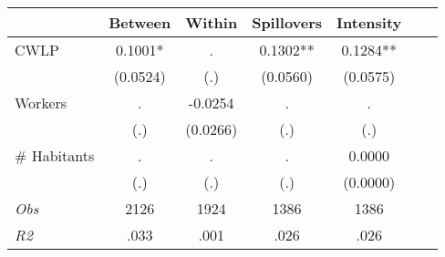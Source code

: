\begin{tabular}{l*{6}{c}}\hline&\multicolumn{1}{c}{Between}&\multicolumn{1}{c}{Within}&\multicolumn{1}{c}{Spillovers}&\multicolumn{1}{c}{Intensity}\\ \hline 
CWLP & 0.1001* & . & 0.1302** & 0.1284** \\
 & (0.0524) & (.) & (0.0560) & (0.0575) \\
Workers & . & -0.0254 & . & . \\
 & (.) & (0.0266) & (.) & (.) \\
\# Habitants & . & . & . & 0.0000 \\
  & (.) & (.) & (.) & (0.0000) \\
\hline \textit{Obs} & 2126 & 1924 & 1386 & 1386  \\ \textit{R2} & .033 & .001 & .026 & .026 \\ \hline \end{tabular}
